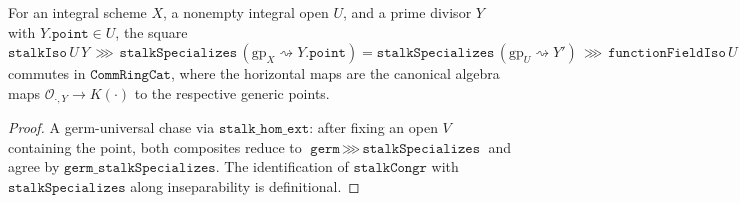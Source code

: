 \begin{lemma}
  \label{lem:functionFieldIso_compat}
  For an integral scheme \(X\), a nonempty integral open \(U\), and a
  prime divisor \(Y\) with \(Y.\texttt{point} \in U\), the square
  \(\texttt{stalkIso}\,U\,Y \,\ggg\, \texttt{stalkSpecializes}\,
   (\text{gp}_X \rightsquigarrow Y.\texttt{point})
   = \texttt{stalkSpecializes}\,(\text{gp}_U \rightsquigarrow Y')
     \,\ggg\, \texttt{functionFieldIso}\,U\)
  commutes in \(\texttt{CommRingCat}\), where the horizontal maps are
  the canonical algebra maps \(\mathcal O_{\cdot, Y} \to K(\cdot)\) to
  the respective generic points.
\end{lemma}
\begin{proof}
  A germ-universal chase via \(\texttt{stalk\_hom\_ext}\): after fixing
  an open \(V\) containing the point, both composites reduce to
  \(\texttt{germ} \,\ggg\, \texttt{stalkSpecializes}\) and agree by
  \(\texttt{germ\_stalkSpecializes}\). The identification of
  \(\texttt{stalkCongr}\) with \(\texttt{stalkSpecializes}\) along
  inseparability is definitional.
\end{proof}

